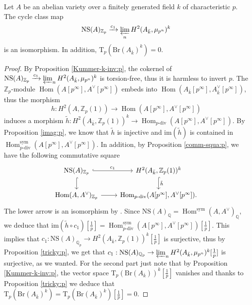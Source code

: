 \documentclass[11pt]{amsart}
\newcommand{\Q}{\mathbb{Q}}
\newcommand{\Z}{\mathbb{Z}}
\newcommand{\kbar}{{\bar{k}}}
\newcommand{\Zp}{{\mathbb{Z}_{p}}}
\newcommand{\Qp}{{\mathbb{Q}_{p}}}
\newcommand{\sym}{{\mathrm{sym}}}
\DeclareMathOperator{\Hom}{Hom}
\newcommand{\Pic}{\mathrm{Pic}}
\newcommand{\Br}{\mathrm{Br}}
\newcommand{\NS}{\mathrm{NS}}
\newcommand{\mupn}{{\mu_{p^n}}}
\newcommand{\Tp}{\mathrm{T}_p}
\begin{document}
\begin{theo}\label{fppf-tate:t}
	Let $A$ be an abelian variety over a finitely generated field $k$ of characteristic $p$. The cycle class map $$\NS(A)_\Zp\xrightarrow{c_1} \varprojlim_n H^2(A_\kbar,\mupn)^k$$ is an isomorphism. In addition, $\Tp(\Br(A_\kbar)^k)=0$.
\end{theo}
\begin{proof} 
By Proposition \ref{Kummer-k-inv:p}, the cokernel of $\NS(A)_\Zp\xrightarrow{c_1} \varprojlim_n H^2(A_\kbar,\mupn)^k$ is torsion-free, thus it is harmless to invert $p$. The $\Zp$-module $\Hom(A[p^\infty],A^\vee[p^\infty])$ embeds into $\Hom(A_\kbar[p^\infty],A^\vee_\kbar[p^\infty])$, thus the morphism $$h:H^2(A,\Zp(1))\to \Hom(A[p^\infty],A^\vee[p^\infty])$$ induces a morphism $\tilde{h}:H^2(A_\kbar,\Z_p(1))^{k}\to \Hom_{p\textrm{-div}}(A[p^\infty],A^\vee[p^\infty])$. By Proposition \ref{imag:p}, we know that $\tilde{h}$ is injective and $\mathrm{im}(\tilde{h})$ is contained in $\Hom_{p\textrm{-div}}^\sym(A[p^\infty],A^\vee[p^\infty])$.
	In addition, by Proposition \ref{comm-squa:p}, we have the following commutative square	
	\begin{equation*}
		\begin{tikzcd}
			\NS(A)_{\Zp}\arrow[r,"c_1",hook]\arrow[d,hook] & H^2(A_\kbar,\Z_p(1))^{k}\arrow[d,"\tilde{h}",hook]\\
			\Hom(A,A^\vee)_{\Zp}\arrow[r] & \Hom_{p\textrm{-div}}(A[p^\infty],A^\vee[p^\infty]).
		\end{tikzcd}
	\end{equation*}
The lower arrow is an isomorphism by \cite[Thm. 2.6]{deJ98}. Since $\NS(A)_{\Q}=\Hom^\sym(A,A^\vee)_{\Q}$, we deduce that $\mathrm{im}(\tilde{h}\circ c_1)[\tfrac{1}{p}]=\Hom_{p\textrm{-div}}^\sym(A[p^\infty],A^\vee[p^\infty])[\tfrac{1}{p}]$. This implies that $c_1:\NS(A)_\Qp\to H^2(A_\kbar,\Z_p(1))^{k}[\tfrac{1}{p}]$ is surjective, thus by Proposition \ref{tricky:p}, we get that $c_1:\NS(A)_\Qp\to \break \varprojlim_n H^2(A_\kbar,\mupn)^k[\tfrac{1}{p}]$ is surjective, as we wanted. For the second part just note that by Proposition \ref{Kummer-k-inv:p}, the vector space $\Tp(\Br(A_\kbar))^k[\tfrac{1}{p}]$ vanishes and thanks to Proposition \ref{tricky:p} we deduce that $\Tp(\Br(A_\kbar)^k)=\Tp(\Br(A_\kbar)^k)[\tfrac{1}{p}]=0$.\end{proof}


\end{document}

